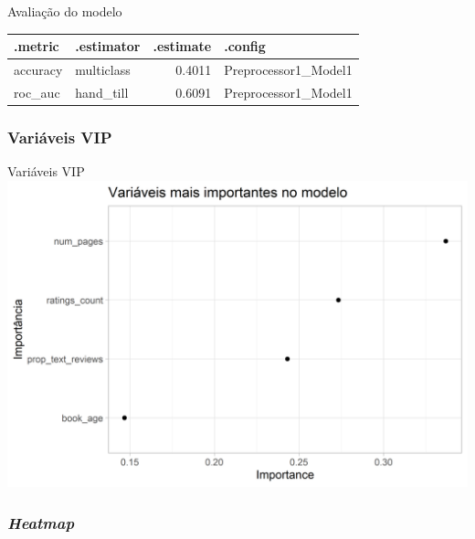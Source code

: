 \documentclass[
  9 pt,
  ignorenonframetext,
]{beamer}
\begin{document}
\begin{frame}[fragile]{Avaliação do modelo}
\begin{table}[H]
\centering
\begin{tabular}{llrl}
\toprule
.metric & .estimator & .estimate & .config\\
\midrule
accuracy & multiclass & 0.4011 & Preprocessor1\_Model1\\
roc\_auc & hand\_till & 0.6091 & Preprocessor1\_Model1\\
\bottomrule
\end{tabular}
\end{table}
\end{frame}

\hypertarget{variuxe1veis-vip}{%
\subsubsection{Variáveis VIP}\label{variuxe1veis-vip}}

\begin{frame}{Variáveis VIP}
\includegraphics{apresentacao_files/figure-beamer/unnamed-chunk-22-1.png}
\end{frame}

\hypertarget{heatmap}{%
\subsubsection{\texorpdfstring{\emph{Heatmap}}{Heatmap}}\label{heatmap}}
\end{document}
